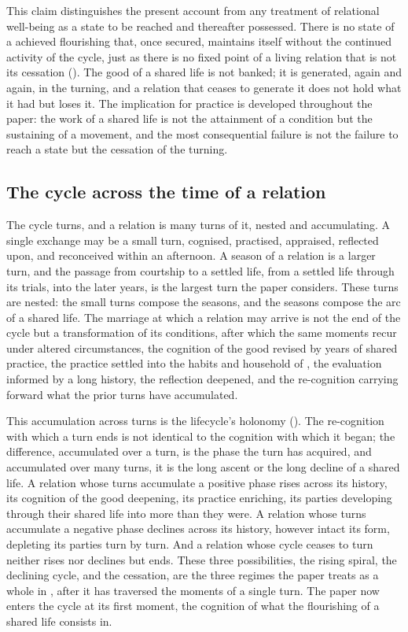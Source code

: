 \noindent
This claim distinguishes the present account from any treatment of relational well-being as a state to be reached and thereafter possessed. There is no state of a achieved flourishing that, once secured, maintains itself without the continued activity of the cycle, just as there is no fixed point of a living relation that is not its cessation (). The good of a shared life is not banked; it is generated, again and again, in the turning, and a relation that ceases to generate it does not hold what it had but loses it. The implication for practice is developed throughout the paper: the work of a shared life is not the attainment of a condition but the sustaining of a movement, and the most consequential failure is not the failure to reach a state but the cessation of the turning.

\subsection{The cycle across the time of a relation}
\label{p11:sec:cyc-time}

The cycle turns, and a relation is many turns of it, nested and accumulating. A single exchange may be a small turn, cognised, practised, appraised, reflected upon, and reconceived within an afternoon. A season of a relation is a larger turn, and the passage from courtship to a settled life, from a settled life through its trials, into the later years, is the largest turn the paper considers. These turns are nested: the small turns compose the seasons, and the seasons compose the arc of a shared life. The marriage at which a relation may arrive is not the end of the cycle but a transformation of its conditions, after which the same moments recur under altered circumstances, the cognition of the good revised by years of shared practice, the practice settled into the habits and household of , the evaluation informed by a long history, the reflection deepened, and the re-cognition carrying forward what the prior turns have accumulated.

This accumulation across turns is the lifecycle's holonomy (). The re-cognition with which a turn ends is not identical to the cognition with which it began; the difference, accumulated over a turn, is the phase the turn has acquired, and accumulated over many turns, it is the long ascent or the long decline of a shared life. A relation whose turns accumulate a positive phase rises across its history, its cognition of the good deepening, its practice enriching, its parties developing through their shared life into more than they were. A relation whose turns accumulate a negative phase declines across its history, however intact its form, depleting its parties turn by turn. And a relation whose cycle ceases to turn neither rises nor declines but ends. These three possibilities, the rising spiral, the declining cycle, and the cessation, are the three regimes the paper treats as a whole in , after it has traversed the moments of a single turn. The paper now enters the cycle at its first moment, the cognition of what the flourishing of a shared life consists in.

